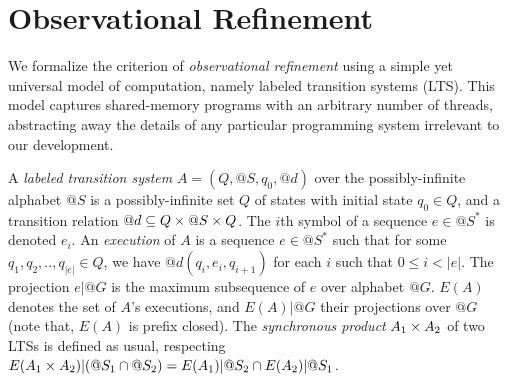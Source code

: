 \section{Observational Refinement}
\label{sec:refinement}


We formalize the criterion of \emph{observational refinement} using a simple
yet universal model of computation, namely labeled transition systems (LTS).
This model captures shared-memory programs with an arbitrary number of threads,
abstracting away the details of any particular programming system irrelevant to
our development.

A \emph{labeled transition system} $A = (Q,@S,q_0,@d)$ over the
possibly-infinite alphabet $@S$ is a possibly-infinite set $Q$ of states with
initial state $q_0 \in Q$, and a transition relation $@d \subseteq Q \times @S \times
Q$. The $i$th symbol of a sequence $e \in @S^*$ is denoted $e_i$. An
\emph{execution} of $A$ is a sequence $e \in @S^*$ such that for some $q_1,
q_2, .., q_{|e|} \in Q$, we have $@d(q_i,e_i,q_{i+1})$ for each $i$ such that
$0 \le i < |e|$. The projection $e|@G$ is the maximum subsequence of $e$ over
alphabet $@G$. $E(A)$ denotes the set of $A$'s executions, and $E(A)|@G$ their
projections over $@G$ (note that, $E(A)$ is prefix closed). 
The \emph{synchronous product} $A_1 \times A_2$ of two LTSs
is defined as usual, respecting $E(A_1 \times A_2)|(@S_1 \cap @S_2) = E(A_1)|@S_2 \cap
E(A_2)|@S_1$.

%
%  
%

